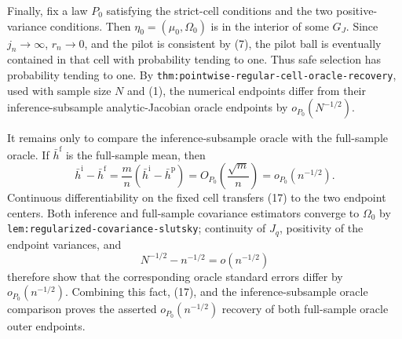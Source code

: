 Finally, fix a law \(P_0\) satisfying the strict-cell conditions and the two positive-variance conditions.  Then \(\eta_0=(\mu_0,\Omega_0)\) is in the interior of some \(G_J\).  Since \(j_n\to\infty\), \(r_n\to0\), and the pilot is consistent by (7), the pilot ball is eventually contained in that cell with probability tending to one.  Thus safe selection has probability tending to one.  By \texttt{thm:pointwise-regular-cell-oracle-recovery}, used with sample size \(N\) and (1), the numerical endpoints differ from their inference-subsample analytic-Jacobian oracle endpoints by \(o_{P_0}(N^{-1/2})\).

It remains only to compare the inference-subsample oracle with the full-sample oracle.  If \(\bar h^{\mathrm f}\) is the full-sample mean, then
\[
 \bar h^{\mathrm i}-\bar h^{\mathrm f}
 =\frac{m}{n}(\bar h^{\mathrm i}-\bar h^{\mathrm p})
 =O_{P_0}\!\left(\frac{\sqrt m}{n}\right)
 =o_{P_0}(n^{-1/2}). \tag{17}
\]
Continuous differentiability on the fixed cell transfers (17) to the two endpoint centers.  Both inference and full-sample covariance estimators converge to \(\Omega_0\) by \texttt{lem:regularized-covariance-slutsky}; continuity of \(J_q\), positivity of the endpoint variances, and
\[
 N^{-1/2}-n^{-1/2}=o(n^{-1/2})
\]
therefore show that the corresponding oracle standard errors differ by \(o_{P_0}(n^{-1/2})\).  Combining this fact, (17), and the inference-subsample oracle comparison proves the asserted \(o_{P_0}(n^{-1/2})\) recovery of both full-sample oracle outer endpoints.
